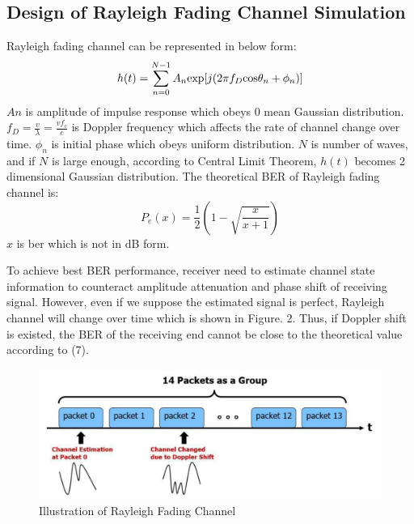 \documentclass[technicalreport]{ieicej}
\begin{document}
\subsection{Design of Rayleigh Fading Channel Simulation}
Rayleigh fading channel can be represented in below form:
\begin{equation}
h(t)=\sum_{n=0}^{N-1}A_n{\rm exp}[j(2\pi f_D{\rm cos}\theta_n+\phi_n)]
\end{equation}
$An$ is amplitude of impulse response which obeys 0 mean Gaussian distribution. $f_D=\frac{v}{\lambda}=\frac{vf_c}{c}$ is Doppler frequency which affects the rate of channel change over time. $\phi_n$ is initial phase which obeys uniform distribution. $N$ is number of waves, and if $N$ is large enough, according to Central Limit Theorem, $h(t)$ becomes 2 dimensional Gaussian distribution\cite{hoeffding1948central}. The theoretical BER of Rayleigh fading channel is\cite{ber}:
\begin{equation}
P_e(x)=\frac{1}{2}\left(1-\sqrt{\frac{x}{x+1}}\right)
\end{equation}
$x$ is ber which is not in dB form.\par
To achieve best BER performance, receiver need to estimate channel state information to counteract amplitude attenuation and phase shift of receiving signal. However, even if we suppose the estimated signal is perfect, Rayleigh channel will change over time which is shown in Figure. 2. Thus, if Doppler shift is existed, the BER of the receiving end cannot be close to the theoretical value according to (7).
\begin{figure}[tbp]
	\begin{center}
		\vspace{0cm}
		\includegraphics[width=\linewidth,clip]{fig/rayleigh_group.pdf}
		\caption{Illustration of Rayleigh Fading Channel}
		\label{fig:sample}
	\end{center}
\end{figure}
\end{document}
